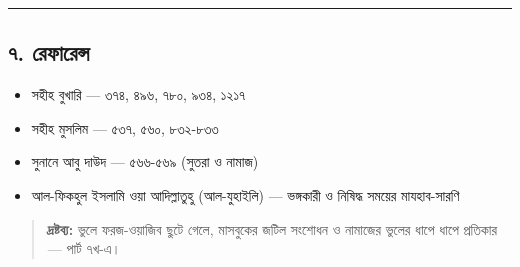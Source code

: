 \medskip\hrule\medskip

\subsection*{৭. রেফারেন্স}

\begin{itemize}
\item সহীহ বুখারি — ৩৭৪, ৪৯৬, ৭৮০, ৯৩৪, ১২১৭
\item সহীহ মুসলিম — ৫৩৭, ৫৬০, ৮৩২-৮৩৩
\item সুনানে আবু দাউদ — ৫৬৬-৫৬৯ (সুতরা ও নামাজ)
\item আল-ফিকহুল ইসলামি ওয়া আদিল্লাতুহু (আল-যুহাইলি) — ভঙ্গকারী ও নিষিদ্ধ সময়ের মাযহাব-সারণি
\end{itemize}
\begin{quote}
\textbf{দ্রষ্টব্য:} ভুলে ফরজ-ওয়াজিব ছুটে গেলে, মাসবুকের জটিল সংশোধন ও নামাজের ভুলের ধাপে ধাপে প্রতিকার — পার্ট ৭খ-এ।
\end{quote}



